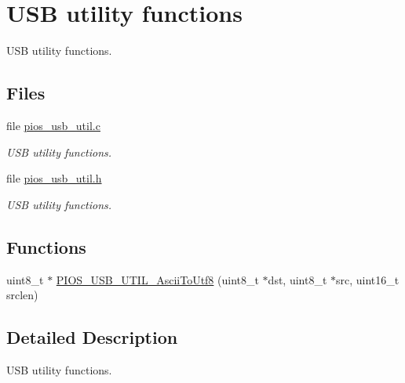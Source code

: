 \hypertarget{group___p_i_o_s___u_s_b___u_t_i_l}{\section{\-U\-S\-B utility functions}
\label{group___p_i_o_s___u_s_b___u_t_i_l}
}


\-U\-S\-B utility functions.  


\subsection*{\-Files}
\begin{DoxyCompactItemize}
\item 
file \hyperlink{pios__usb__util_8c}{pios\-\_\-usb\-\_\-util.\-c}
\begin{DoxyCompactList}\small\item\em \-U\-S\-B utility functions. \end{DoxyCompactList}\item 
file \hyperlink{pios__usb__util_8h}{pios\-\_\-usb\-\_\-util.\-h}
\begin{DoxyCompactList}\small\item\em \-U\-S\-B utility functions. \end{DoxyCompactList}\end{DoxyCompactItemize}
\subsection*{\-Functions}
\begin{DoxyCompactItemize}
\item 
uint8\-\_\-t $\ast$ \hyperlink{group___p_i_o_s___u_s_b___u_t_i_l_gad53b22f8c49091387440392e18678ab8}{\-P\-I\-O\-S\-\_\-\-U\-S\-B\-\_\-\-U\-T\-I\-L\-\_\-\-Ascii\-To\-Utf8} (uint8\-\_\-t $\ast$dst, uint8\-\_\-t $\ast$src, uint16\-\_\-t srclen)
\end{DoxyCompactItemize}


\subsection{\-Detailed \-Description}
\-U\-S\-B utility functions. 

